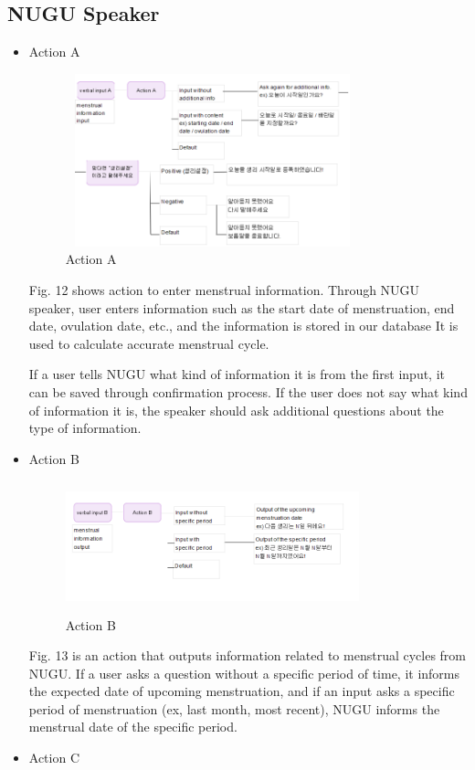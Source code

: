 \documentclass[conference]{IEEEtran}
\begin{document}
\subsection{NUGU Speaker}
\begin{itemize}
\setlength{\parindent}{2ex}
    \item Action A 
    
    \begin{figure}[ht]
    \includegraphics[width=8.5cm, height=5cm, center]{A-1.PNG}
    \caption{Action A}
    \label{fig : Action A}
    \end{figure}
    Fig. 12 shows action to enter menstrual information. Through NUGU speaker, user enters information such as the start date of menstruation, end date, ovulation date, etc., and the information is stored in our database It is used to calculate accurate menstrual cycle. \par
    
    If a user tells NUGU what kind of information it is from the first input, it can be saved through confirmation process.
    If the user does not say what kind of information it is, the speaker should ask additional questions about the type of information.
    \item Action B
    
    \begin{figure}[ht]
    \includegraphics[width=8.5cm, height=3.8cm, right]{B.PNG}
    \caption{Action B}
    \label{fig : Action B}
    \end{figure}
    Fig. 13 is an action that outputs information related to menstrual cycles from NUGU. If a user asks a question without a specific period of time, it informs the expected date of upcoming menstruation, and if an input asks a specific period of menstruation (ex, last month, most recent), NUGU informs the menstrual date of the specific period.
    \item Action C
    

\end{itemize}
\end{document}
